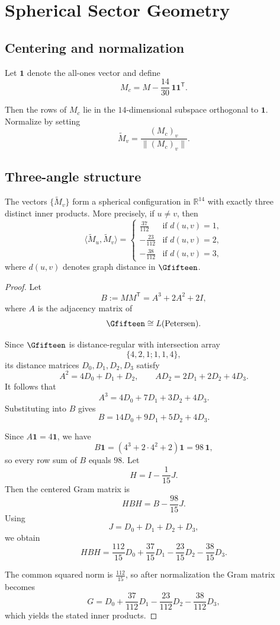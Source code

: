 \section{Spherical Sector Geometry}

\subsection{Centering and normalization}

Let $\mathbf{1}$ denote the all-ones vector and define
\[
M_c = M - \frac{14}{30}\,\mathbf{1}\mathbf{1}^{\mathsf T}.
\]

Then the rows of $M_c$ lie in the $14$-dimensional subspace orthogonal to
$\mathbf{1}$. Normalize by setting
\[
\widetilde{M}_v = \frac{(M_c)_v}{\|(M_c)_v\|}.
\]

\subsection{Three-angle structure}

\begin{theorem}
The vectors $\{\widetilde{M}_v\}$ form a spherical configuration in
$\mathbb{R}^{14}$ with exactly three distinct inner products.
More precisely, if $u \neq v$, then
\[
\langle \widetilde{M}_u, \widetilde{M}_v \rangle
=
\begin{cases}
\frac{37}{112} & \text{if } d(u,v)=1, \\[4pt]
-\frac{23}{112} & \text{if } d(u,v)=2, \\[4pt]
-\frac{38}{112} & \text{if } d(u,v)=3,
\end{cases}
\]
where $d(u,v)$ denotes graph distance in $\Gfifteen$.
\end{theorem}

\begin{proof}
Let
\[
B := M M^{\mathsf T} = A^3 + 2A^2 + 2I,
\]
where $A$ is the adjacency matrix of
\[
\Gfifteen \cong L(\mathrm{Petersen}).
\]

Since $\Gfifteen$ is distance-regular with intersection array
\[
\{4,2,1;1,1,4\},
\]
its distance matrices $D_0,D_1,D_2,D_3$ satisfy
\[
A^2 = 4D_0 + D_1 + D_2,
\qquad
A D_2 = 2D_1 + 2D_2 + 4D_3.
\]
It follows that
\[
A^3 = 4D_0 + 7D_1 + 3D_2 + 4D_3.
\]
Substituting into $B$ gives
\[
B = 14D_0 + 9D_1 + 5D_2 + 4D_3.
\]

Since $A\mathbf{1}=4\mathbf{1}$, we have
\[
B\mathbf{1} = (4^3 + 2\cdot4^2 + 2)\mathbf{1} = 98\,\mathbf{1},
\]
so every row sum of $B$ equals $98$. Let
\[
H = I - \frac{1}{15}J.
\]
Then the centered Gram matrix is
\[
HBH = B - \frac{98}{15}J.
\]
Using
\[
J = D_0 + D_1 + D_2 + D_3,
\]
we obtain
\[
HBH
=
\frac{112}{15}D_0
+\frac{37}{15}D_1
-\frac{23}{15}D_2
-\frac{38}{15}D_3.
\]

The common squared norm is $\frac{112}{15}$, so after normalization the
Gram matrix becomes
\[
G
=
D_0
+\frac{37}{112}D_1
-\frac{23}{112}D_2
-\frac{38}{112}D_3,
\]
which yields the stated inner products.
\end{proof}

